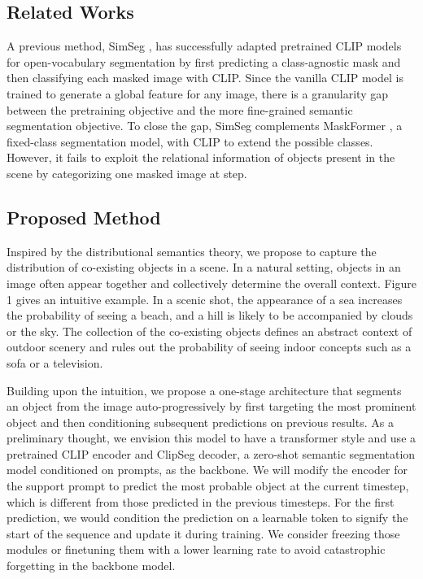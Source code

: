 \documentclass[10pt,twocolumn,letterpaper]{article}
\begin{document}
\subsection{Related Works}

A previous method, SimSeg \cite{simseg}, has successfully adapted pretrained CLIP models \cite{clip} for open-vocabulary segmentation by first predicting a class-agnostic mask and then classifying each masked image with CLIP. Since the vanilla CLIP model is trained to generate a global feature for any image, there is a granularity gap between the pretraining objective and the more fine-grained semantic segmentation objective. To close the gap, SimSeg complements MaskFormer \cite{maskformer}, a fixed-class segmentation model, with CLIP to extend the possible classes. However, it fails to exploit the relational information of objects present in the scene by categorizing one masked image at step.

\subsection{Proposed Method}

Inspired by the distributional semantics theory, we propose to capture the distribution of co-existing objects in a scene. In a natural setting, objects in an image often appear together and collectively determine the overall context. Figure 1 gives an intuitive example. In a scenic shot, the appearance of a sea increases the probability of seeing a beach, and a hill is likely to be accompanied by clouds or the sky. The collection of the co-existing objects defines an abstract context of outdoor scenery and rules out the probability of seeing indoor concepts such as a sofa or a television. 

Building upon the intuition, we propose a one-stage architecture that segments an object from the image auto-progressively by first targeting the most prominent object and then conditioning subsequent predictions on previous results. As a preliminary thought, we envision this model to have a transformer style and use a pretrained CLIP encoder and ClipSeg \cite{clipseg} decoder, a zero-shot semantic segmentation model conditioned on prompts, as the backbone. We will modify the encoder for the support prompt to predict the most probable object at the current timestep, which is different from those predicted in the previous timesteps. For the first prediction, we would condition the prediction on a learnable token to signify the start of the sequence and update it during training. We consider freezing those modules or finetuning them with a lower learning rate to avoid catastrophic forgetting in the backbone model.
\end{document}
